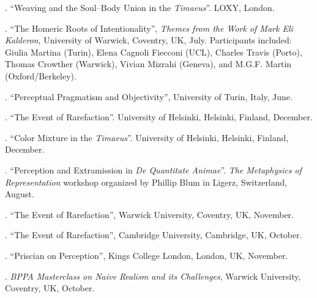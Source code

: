 \documentclass[11pt]{article}
\begin{document}

 \bigskip

\medskip

. ``Weaving and the Soul–Body Union in the \emph{Timaeus}''. LOXY, London.

. ``The Homeric Roots of Intentionality'', \emph{Themes from the Work of Mark Eli Kalderon}, University of Warwick, Coventry, UK, July. Participants included: Giulia Martina (Turin), Elena Cagnoli Fiecconi (UCL), Charles Travis (Porto), Thomas Crowther (Warwick), Vivian Mizrahi (Geneva), and M.G.F. Martin (Oxford/Berkeley).

. ``Perceptual Pragmatism and Objectivity'', University of Turin, Italy, June.

. ``The Event of Rarefaction''. University of Helsinki, Helsinki, Finland, December.

. ``Color Mixture in the \emph{Timaeus}''. University of Helsinki, Helsinki, Finland, December.

. ``Perception and Extramission in \emph{De Quantitate Animae}''. \emph{The Metaphysics of Representation} workshop organized by Phillip Blum in Ligerz, Switzerland, August.

. ``The Event of Rarefaction'', Warwick University, Coventry, UK, November.

. ``The Event of Rarefaction'', Cambridge University, Cambridge, UK, October.

. ``Priscian on Perception'', Kings College London, London, UK, November.

. \emph{BPPA Masterclass on Naive Realism and its Challenges}, Warwick University, Coventry, UK, October.
\end{document}
